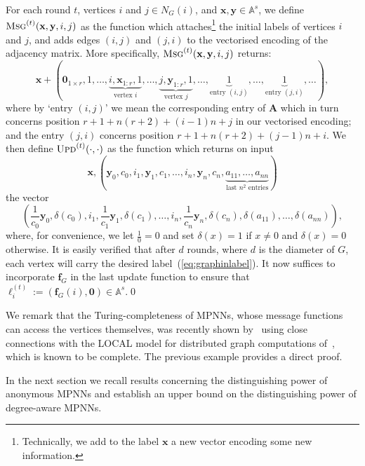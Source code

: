 \begin{example}
For each round $t$, vertices $i$ and $j\in N_G(i)$, and $\mathbf{x},\mathbf{y}\in\mathbb{A}^s$, we define
$
\textsc{Msg}^{(t)}(\mathbf{x},\mathbf{y},i,j)
$
as the function which attaches\footnote{Technically, we add to the label
$\textbf{x}$ a new vector encoding some new information.} the initial labels of
vertices $i$ and $j$, and adds edges $(i,j)$ and $(j,i)$ to the vectorised
encoding of the adjacency matrix.  More specifically, $
\textsc{Msg}^{(t)}(\mathbf{x},\mathbf{y},i,j)
$ returns:
\[
\mathbf{x}+(\mathbf{0}_{1\times r},1,\ldots,\underbrace{i,\mathbf{x}_{1:r},1}_{\text{vertex $i$}},\ldots, \underbrace{j,\mathbf{y}_{1:r},1}_{\text{vertex $j$}},\ldots,\underbrace{1}_{\text{entry $(i,j)$}},\ldots,\underbrace{1}_{\text{entry $(j,i)$}},\ldots),
\]
where by `entry $(i,j)$' we mean the corresponding entry of $\mathbf{A}$ which in turn concerns position $r+1+n(r+2)+(i-1)n+j$ in our vectorised encoding;
and the entry $(j,i)$
concerns position $r+1+n(r+2)+(j-1)n+i$. We then define
$\textsc{Upd}^{(t)}(\cdot,\cdot)$ as the
function which returns on input 
\[
\mathbf{x}, \left(\mathbf{y}_0,c_0,i_1,\mathbf{y}_1,c_1,\ldots,i_n,\mathbf{y}_n,c_n, \underbrace{a_{11},\ldots,a_{nn}}_{\text{last $n^2$ entries}}\right)
\]
the vector
\[
\left(\frac{1}{c_0}\mathbf{y}_0,\delta(c_0),i_1,\frac{1}{c_1}\mathbf{y}_1,\delta(c_1),\ldots,
i_n,\frac{1}{c_n}\mathbf{y}_n,\delta(c_n),\delta(a_{11}),\ldots,\delta(a_{nn})\right),
\]
where, for convenience, we let $\frac{1}{0}=0$ and
set $\delta(x)=1$ if $x\neq 0$ and $\delta(x)=0$ otherwise. It is easily verified that after $d$ rounds, where $d$ is the diameter of $G$, each vertex will carry
the desired label~(\ref{eq:graphinlabel}). It now suffices to incorporate $\mathbf{f}_G$ in the last update function to ensure that $\pmb{\ell}_i^{(t)}:=(\mathbf{f}_G(i),\mathbf{0})\in\mathbb{A}^s$.\qed
\end{example}
We remark that the Turing-completeness of MPNNs, whose message functions can access  the vertices themselves, was recently shown by~\cite{Loukas2019}  using close connections with the LOCAL model for distributed graph computations of~\cite{Angluin}, which is known to be complete. The previous example provides a direct proof.

In the next section we recall results concerning the distinguishing power of anonymous MPNNs and establish an upper bound on the distinguishing power of degree-aware MPNNs.


